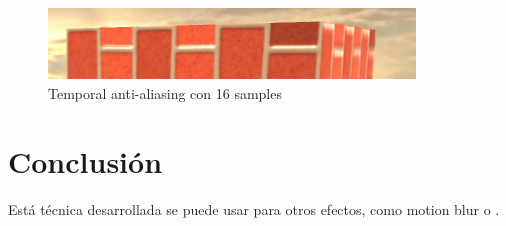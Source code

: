 \documentclass[withindex, glossary]{cam-thesis}
\begin{document}
\begin{figure}[!htbp]
    \includegraphics[width=\linewidth]{figures/taa16.png}
    \caption{Temporal anti-aliasing con 16 samples}
    \label{taa16}
\end{figure}

\chapter{Conclusión}

Está técnica desarrollada se puede usar para otros efectos, como motion blur o \@.

\nocite{*}
\printbibliography{}

\listoffigures

\printthesisindex{}
\end{document}
